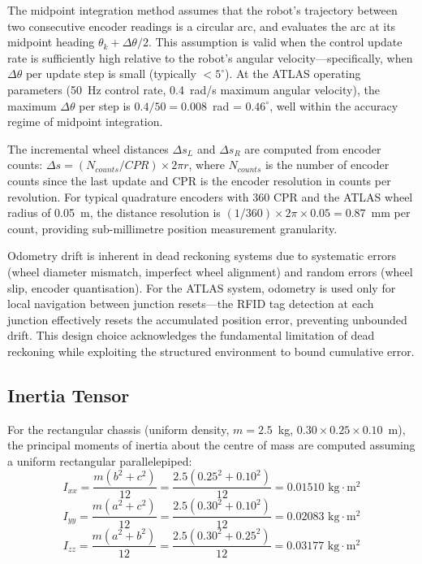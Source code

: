 \documentclass[12pt,a4paper,oneside]{report}
\begin{document}
The midpoint integration method assumes that the robot's trajectory between two consecutive encoder readings is a circular arc, and evaluates the arc at its midpoint heading $\theta_k + \Delta\theta/2$. This assumption is valid when the control update rate is sufficiently high relative to the robot's angular velocity---specifically, when $\Delta\theta$ per update step is small (typically $< 5^{\circ}$). At the ATLAS operating parameters (50~Hz control rate, 0.4~rad/s maximum angular velocity), the maximum $\Delta\theta$ per step is $0.4/50 = 0.008$~rad = $0.46^{\circ}$, well within the accuracy regime of midpoint integration.

The incremental wheel distances $\Delta s_L$ and $\Delta s_R$ are computed from encoder counts: $\Delta s = (N_{counts} / CPR) \times 2\pi r$, where $N_{counts}$ is the number of encoder counts since the last update and CPR is the encoder resolution in counts per revolution. For typical quadrature encoders with 360 CPR and the ATLAS wheel radius of 0.05~m, the distance resolution is $(1/360) \times 2\pi \times 0.05 = 0.87$~mm per count, providing sub-millimetre position measurement granularity.

Odometry drift is inherent in dead reckoning systems due to systematic errors (wheel diameter mismatch, imperfect wheel alignment) and random errors (wheel slip, encoder quantisation). For the ATLAS system, odometry is used only for local navigation between junction resets---the RFID tag detection at each junction effectively resets the accumulated position error, preventing unbounded drift. This design choice acknowledges the fundamental limitation of dead reckoning while exploiting the structured environment to bound cumulative error.

\subsection{Inertia Tensor}

For the rectangular chassis (uniform density, $m = 2.5$~kg, $0.30 \times 0.25 \times 0.10$~m), the principal moments of inertia about the centre of mass are computed assuming a uniform rectangular parallelepiped:
\begin{equation}
I_{xx} = \frac{m(b^2 + c^2)}{12} = \frac{2.5(0.25^2 + 0.10^2)}{12} = 0.01510 \text{~kg} \cdot \text{m}^2
\label{eq:ixx}
\end{equation}
\begin{equation}
I_{yy} = \frac{m(a^2 + c^2)}{12} = \frac{2.5(0.30^2 + 0.10^2)}{12} = 0.02083 \text{~kg} \cdot \text{m}^2
\label{eq:iyy}
\end{equation}
\begin{equation}
I_{zz} = \frac{m(a^2 + b^2)}{12} = \frac{2.5(0.30^2 + 0.25^2)}{12} = 0.03177 \text{~kg} \cdot \text{m}^2
\label{eq:izz}
\end{equation}
\end{document}
